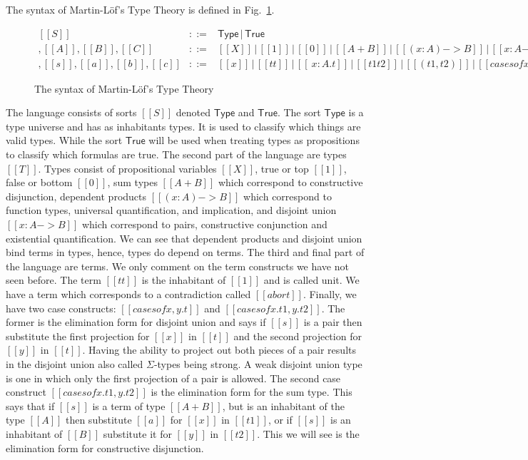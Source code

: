 The syntax of Martin-L\"of's Type Theory is defined in
Fig.~\ref{fig:lof_syntax}.
\begin{figure}
  \begin{center}
    \begin{math}
      \begin{array}{lll}
        [[S]] & ::= & \mathsf{Type}\,|\,\mathsf{True}\\
        [[T]], [[A]], [[B]], [[C]]        & ::= & [[X]]\,|\,[[1]]\,|\,[[0]]\,|\,[[A + B]]\,|\,[[( x : A ) -> B]]\,|\,[[{ x : A } -> B]]\\
        [[t]], [[s]], [[a]], [[b]], [[c]] & ::= & [[x]]\,|\,[[tt]]\,|\,[[\ x : A . t]]\,|\,[[t1 t2]]\,|\,[[( t1 , t2 )]]\,|\,[[case s of x , y . t]]\,|\,[[case s of x . t1 , y . t2]]\,|\,[[abort]]
      \end{array}
    \end{math}
  \end{center}
  \caption{The syntax of Martin-L\"of's Type Theory}
  \label{fig:lof_syntax}
\end{figure}
The language consists of sorts $[[S]]$ denoted $\mathsf{Type}$ and
$\mathsf{True}$. The sort $\mathsf{Type}$ is a type universe and has
as inhabitants types.  It is used to classify which things are valid
types.  While the sort $\mathsf{True}$ will be used when treating
types as propositions to classify which formulas are true. The second
part of the language are types $[[T]]$.  Types consist of
propositional variables $[[X]]$, true or top $[[1]]$, false or bottom
$[[0]]$, sum types $[[A + B]]$ which correspond to constructive
disjunction, dependent products $[[(x : A) -> B]]$ which correspond to
function types, universal quantification, and implication, and
disjoint union $[[{ x : A} -> B]]$ which correspond to pairs,
constructive conjunction and existential quantification.  We can see
that dependent products and disjoint union bind terms in types, hence,
types do depend on terms.  The third and final part of the language
are terms.  We only comment on the term constructs we have not seen
before.  The term $[[tt]]$ is the inhabitant of $[[1]]$ and is called
unit.  We have a term which corresponds to a contradiction called
$[[abort]]$. Finally, we have two case constructs: $[[case s of
    x,y.t]]$ and $[[case s of x.t1,y.t2]]$.  The former is the
elimination form for disjoint union and says if $[[s]]$ is a pair then
substitute the first projection for $[[x]]$ in $[[t]]$ and the second
projection for $[[y]]$ in $[[t]]$.  Having the ability to project out
both pieces of a pair results in the disjoint union also called
$\Sigma$-types being strong.  A weak disjoint union type is one in
which only the first projection of a pair is allowed.  The second case
construct $[[case s of x.t1,y.t2]]$ is the elimination form for the
sum type.  This says that if $[[s]]$ is a term of type $[[A+B]]$, but
is an inhabitant of the type $[[A]]$ then substitute $[[a]]$ for
$[[x]]$ in $[[t1]]$, or if $[[s]]$ is an inhabitant of $[[B]]$
substitute it for $[[y]]$ in $[[t2]]$.  This we will see is the
elimination form for constructive disjunction.

